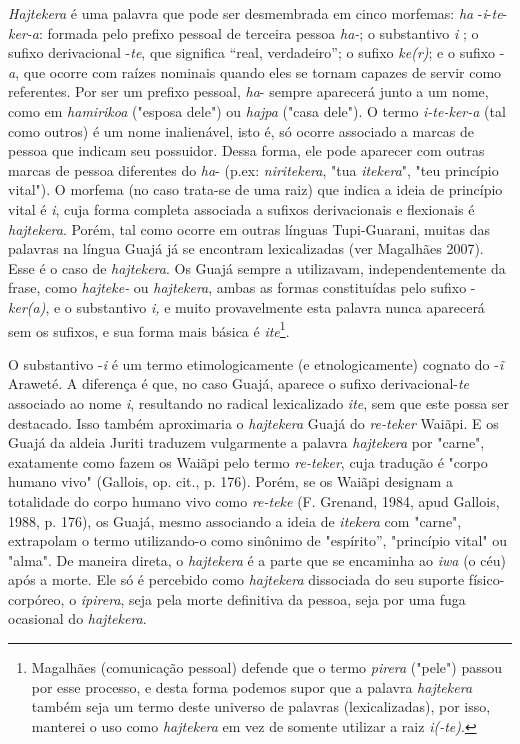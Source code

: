 \emph{Hajtekera} é uma palavra que pode ser desmembrada em cinco
morfemas: \emph{ha} -\emph{i}-\emph{te}-\emph{ker-a}: formada pelo
prefixo pessoal de terceira pessoa \emph{ha-}; o substantivo \emph{i} ;
o sufixo derivacional -\emph{te}, que significa ``real, verdadeiro''; o
sufixo \emph{ke(r)}; e o sufixo -\emph{a}, que ocorre com raízes
nominais quando eles se tornam capazes de servir como referentes. Por
ser um prefixo pessoal, \emph{ha}- sempre aparecerá junto a um nome,
como em \emph{hamirikoa} ("esposa dele") ou \emph{hajpa} ("casa dele").
O termo \emph{i-te-ker-a} (tal como outros) é um nome inalienável, isto
é, só ocorre associado a marcas de pessoa que indicam seu possuidor.
Dessa forma, ele pode aparecer com outras marcas de pessoa diferentes do
\emph{ha}- (p.ex: \emph{niritekera}, "tua \emph{itekera}", "teu
princípio vital"). O morfema (no caso trata-se de uma raiz) que indica a
ideia de princípio vital é \emph{i}, cuja forma completa associada a
sufixos derivacionais e flexionais é \emph{hajtekera}. Porém, tal como
ocorre em outras línguas Tupi-Guarani, muitas das palavras na língua
Guajá já se encontram lexicalizadas (ver Magalhães 2007). Esse é o caso
de \emph{hajtekera}. Os Guajá sempre a utilizavam, independentemente da
frase, como \emph{hajteke-} ou \emph{hajtekera}, ambas as formas
constituídas pelo sufixo -\emph{ker(a)}, e o substantivo \emph{i,} e
muito provavelmente esta palavra nunca aparecerá sem os sufixos, e sua
forma mais básica é \emph{ite}\footnote{Magalhães (comunicação pessoal)
  defende que o termo \emph{pirera} ("pele") passou por esse processo, e
  desta forma podemos supor que a palavra \emph{hajtekera} também seja
  um termo deste universo de palavras (lexicalizadas), por isso,
  manterei o uso como \emph{hajtekera} em vez de somente utilizar a raiz
  \emph{i(-te)}.}.

O substantivo -\emph{i} é um termo etimologicamente (e etnologicamente)
cognato do -\emph{ĩ} Araweté. A diferença é que, no caso Guajá, aparece
o sufixo derivacional-\emph{te} associado ao nome \emph{i}, resultando
no radical lexicalizado \emph{ite}, sem que este possa ser destacado.
Isso também aproximaria o \emph{hajtekera} Guajá do \emph{re-teker}
Waiãpi. E os Guajá da aldeia Juriti traduzem vulgarmente a palavra
\emph{hajtekera} por "carne", exatamente como fazem os Waiãpi pelo termo
\emph{re-teker}, cuja tradução é "corpo humano vivo" (Gallois, op. cit.,
p. 176). Porém, se os Waiãpi designam a totalidade do corpo humano vivo
como \emph{re-teke} (F. Grenand, 1984, apud Gallois, 1988, p. 176), os
Guajá, mesmo associando a ideia de \emph{itekera} com "carne",
extrapolam o termo utilizando-o como sinônimo de "espírito'', "princípio
vital" ou "alma". De maneira direta, o \emph{hajtekera} é a parte que se
encaminha ao \emph{iwa} (o céu) após a morte. Ele só é percebido como
\emph{hajtekera} dissociada do seu suporte físico-corpóreo, o
\emph{ipirera}, seja pela morte definitiva da pessoa, seja por uma fuga
ocasional do \emph{hajtekera}.


